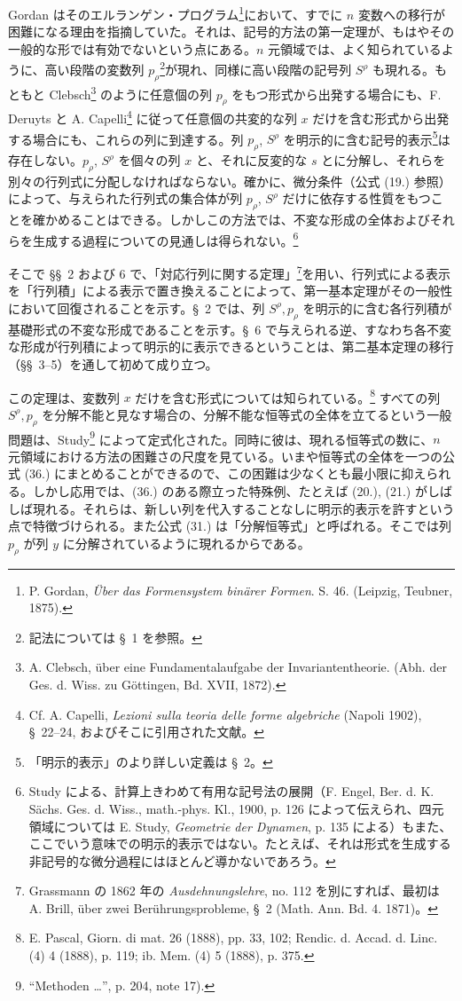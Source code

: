 \documentclass[11pt]{jlreq}
\begin{document}
Gordan はそのエルランゲン・プログラム\footnote{P. Gordan, \emph{Über das Formensystem binärer Formen}. S. 46. (Leipzig, Teubner, 1875).}において、すでに $n$ 変数への移行が困難になる理由を指摘していた。それは、記号的方法の第一定理が、もはやその一般的な形では有効でないという点にある。$n$ 元領域では、よく知られているように、高い段階の変数列 $p_\rho$\footnote{記法については \S\ 1 を参照。}が現れ、同様に高い段階の記号列 $S^\rho$ も現れる。もともと Clebsch\footnote{A. Clebsch, über eine Fundamentalaufgabe der Invariantentheorie. (Abh. der Ges. d. Wiss. zu Göttingen, Bd. XVII, 1872).} のように任意個の列 $p_\rho$ をもつ形式から出発する場合にも、F. Deruyts と A. Capelli\footnote{Cf. A. Capelli, \emph{Lezioni sulla teoria delle forme algebriche} (Napoli 1902), \S\ 22--24, およびそこに引用された文献。} に従って任意個の共変的な列 $x$ だけを含む形式から出発する場合にも、これらの列に到達する。列 $p_\rho$, $S^\rho$ を明示的に含む記号的表示\footnote{「明示的表示」のより詳しい定義は \S\ 2。}は存在しない。$p_\rho$, $S^\rho$ を個々の列 $x$ と、それに反変的な $s$ とに分解し、それらを別々の行列式に分配しなければならない。確かに、微分条件（公式 (19.) 参照）によって、与えられた行列式の集合体が列 $p_\rho$, $S^\rho$ だけに依存する性質をもつことを確かめることはできる。しかしこの方法では、不変な形成の全体およびそれらを生成する過程についての見通しは得られない。\footnote{Study による、計算上きわめて有用な記号法の展開（F. Engel, Ber. d. K. Sächs. Ges. d. Wiss., math.-phys. Kl., 1900, p. 126 によって伝えられ、四元領域については E. Study, \emph{Geometrie der Dynamen}, p. 135 による）もまた、ここでいう意味での明示的表示ではない。たとえば、それは形式を生成する非記号的な微分過程にはほとんど導かないであろう。}

そこで \S\S\ 2 および 6 で、「対応行列に関する定理」\footnote{Grassmann の 1862 年の \emph{Ausdehnungslehre}, no. 112 を別にすれば、最初は A. Brill, über zwei Berührungsprobleme, \S\ 2 (Math. Ann. Bd. 4. 1871)。}を用い、行列式による表示を「行列積」による表示で置き換えることによって、第一基本定理がその一般性において回復されることを示す。\S\ 2 では、列 $S^\rho,p_\rho$ を明示的に含む各行列積が基礎形式の不変な形成であることを示す。\S\ 6 で与えられる逆、すなわち各不変な形成が行列積によって明示的に表示できるということは、第二基本定理の移行（\S\S\ 3--5）を通して初めて成り立つ。

この定理は、変数列 $x$ だけを含む形式については知られている。\footnote{E. Pascal, Giorn. di mat. 26 (1888), pp. 33, 102; Rendic. d. Accad. d. Linc. (4) 4 (1888), p. 119; ib. Mem. (4) 5 (1888), p. 375.} すべての列 $S^\rho,p_\rho$ を分解不能と見なす場合の、分解不能な恒等式の全体を立てるという一般問題は、Study\footnote{``Methoden \dots'', p. 204, note 17).} によって定式化された。同時に彼は、現れる恒等式の数に、$n$ 元領域における方法の困難さの尺度を見ている。いまや恒等式の全体を一つの公式 (36.) にまとめることができるので、この困難は少なくとも最小限に抑えられる。しかし応用では、(36.) のある際立った特殊例、たとえば (20.), (21.) がしばしば現れる。それらは、新しい列を代入することなしに明示的表示を許すという点で特徴づけられる。また公式 (31.) は「分解恒等式」と呼ばれる。そこでは列 $p_\rho$ が列 $y$ に分解されているように現れるからである。
\end{document}
